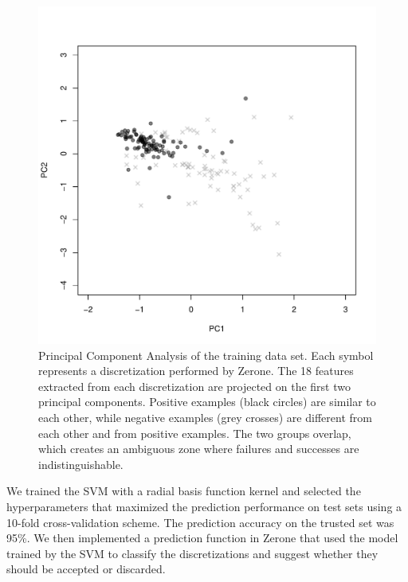 \documentclass{bioinfo}
\begin{document}
\begin{methods}
\begin{figure}[!tpb]
\centerline{\includegraphics[scale=0.4]{pca_bw.pdf}}
\caption{
  Principal Component Analysis of the training data set.
  Each symbol represents a discretization performed by Zerone. The
  18 features extracted from each discretization are projected on the
  first two principal components. Positive examples (black circles)
  are similar to each other, while negative examples (grey crosses)
  are different from each other and from positive examples. The two
  groups overlap, which creates an ambiguous zone where failures and
  successes are indistinguishable.
}\label{fig:pca_bw}
\end{figure}

We trained the SVM with a radial basis function kernel and
selected the hyperparameters that maximized the prediction
performance on test sets using a 10-fold cross-validation scheme.
The prediction accuracy on the trusted set was 95\%.
We then implemented a prediction function in Zerone that used the
model trained by the SVM to classify the discretizations and
suggest whether they should be accepted or discarded.


\end{methods}
\end{document}
